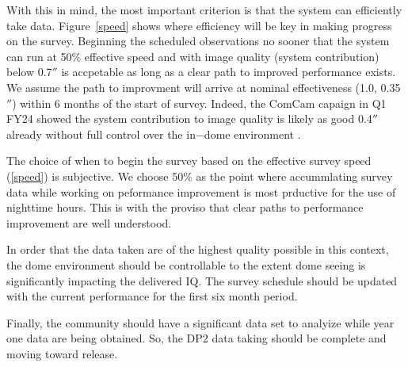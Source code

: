 With this in mind, the most important criterion is that the system can efficiently take data. Figure~\ref{speed} shows where efficiency will be key in making progress on the survey. Beginning the scheduled observations no sooner that the system can run at 50$\%$ effective speed and with image quality (system contribution) below 0.7$''$ is accpetable as long as a clear path to improved performance exists. We assume the path to improvment will arrive at nominal effectiveness (1.0, 0.35$''$) within 6 months of the start of survey. Indeed, the ComCam capaign in Q1 FY24 showed the system contribution to image quality is likely as good 0.4$''$ already without full control over the in$-$dome environment \citep[See][ section 2.2]{SITCOMTN-149}.

The choice of when to begin the survey based on the effective survey speed (\ref{speed}) is subjective. We choose 50$\%$ as the point where accummlating survey data while working on peformance improvement is most prductive for the use of nighttime hours. This is with the proviso that clear paths to performance improvement are well understood.

In order that the data taken are of the highest quality possible in this context, the dome environment should be controllable to the extent dome seeing is significantly impacting the delivered IQ. The survey schedule should be updated with the current performance for the first six month period.

Finally, the community should have a significant data set to analyize while year one data are being obtained. So, the DP2 data taking should be complete and moving toward release. 
